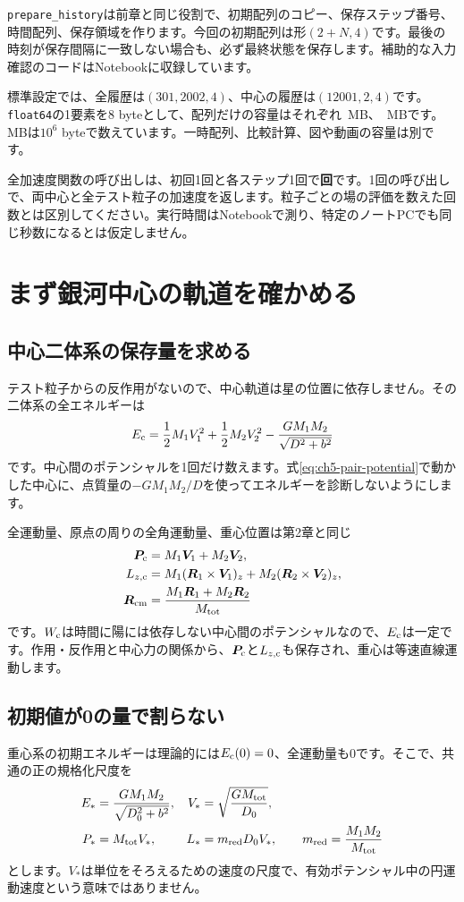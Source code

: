 \texttt{prepare\_history}は前章と同じ役割で、初期配列のコピー、保存ステップ番号、時間配列、保存領域を作ります。今回の初期配列は形$(2+N,4)$です。最後の時刻が保存間隔に一致しない場合も、必ず最終状態を保存します。補助的な入力確認のコードはNotebookに収録しています。

標準設定では、全履歴は$(301,2002,4)$、中心の履歴は$(12001,2,4)$です。\texttt{float64}の1要素を8 byteとして、配列だけの容量はそれぞれ\chfivevalHistoryMB\ MB、\chfivevalCenterMB\ MBです。MBは$10^6$ byteで数えています。一時配列、比較計算、図や動画の容量は別です。

全加速度関数の呼び出しは、初回1回と各ステップ1回で\textbf{\chfivevalForce 回}です。1回の呼び出しで、両中心と全テスト粒子の加速度を返します。粒子ごとの場の評価を数えた回数とは区別してください。実行時間はNotebookで測り、特定のノートPCでも同じ秒数になるとは仮定しません。

\section{まず銀河中心の軌道を確かめる}
\label{sec:ch5-center-check}
\subsection{中心二体系の保存量を求める}
テスト粒子からの反作用がないので、中心軌道は星の位置に依存しません。その二体系の全エネルギーは
\begin{equation}
E_{\rm c}=\frac12M_1V_1^2+\frac12M_2V_2^2-\frac{GM_1M_2}{\sqrt{D^2+b^2}}
\label{eq:ch5-center-energy}
\end{equation}
です。中心間のポテンシャルを1回だけ数えます。式\eqref{eq:ch5-pair-potential}で動かした中心に、点質量の$-GM_1M_2/D$を使ってエネルギーを診断しないようにします。

全運動量、原点の周りの全角運動量、重心位置は第2章と同じ
\begin{align}
\boldsymbol P_{\rm c}&=M_1\boldsymbol V_1+M_2\boldsymbol V_2,\notag\\
L_{z,{\rm c}}&=M_1(\boldsymbol R_1\times\boldsymbol V_1)_z+M_2(\boldsymbol R_2\times\boldsymbol V_2)_z,\notag\\
\boldsymbol R_{\rm cm}&=\frac{M_1\boldsymbol R_1+M_2\boldsymbol R_2}{M_{\rm tot}}
\label{eq:ch5-center-momentum}
\end{align}
です。$W_{\rm c}$は時間に陽には依存しない中心間のポテンシャルなので、$E_{\rm c}$は一定です。作用・反作用と中心力の関係から、$\boldsymbol P_{\rm c}$と$L_{z,{\rm c}}$も保存され、重心は等速直線運動します。

\subsection{初期値が0の量で割らない}
重心系の初期エネルギーは理論的には$E_{\rm c}(0)=0$、全運動量も0です。そこで、共通の正の規格化尺度を
\begin{align}
E_*&=\frac{GM_1M_2}{\sqrt{D_0^2+b^2}},&
V_*&=\sqrt{\frac{GM_{\rm tot}}{D_0}},\notag\\
P_*&=M_{\rm tot} V_*,&
L_*&=m_{\rm red} D_0V_*,\qquad m_{\rm red}=\frac{M_1M_2}{M_{\rm tot}}
\label{eq:ch5-error-scales}
\end{align}
とします。$V_*$は単位をそろえるための速度の尺度で、有効ポテンシャル中の円運動速度という意味ではありません。

